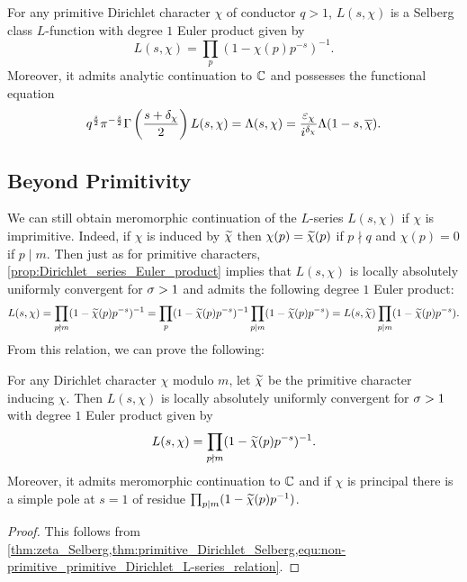       \begin{theorem}\label{thm:primitive_Dirichlet_Selberg}
        For any primitive Dirichlet character $\chi$ of conductor $q > 1$, $L(s,\chi)$ is a Selberg class $L$-function with degree $1$ Euler product given by
        \[
          L(s,\chi) = \prod_{p}(1-\chi(p)p^{-s})^{-1}.
        \]
        Moreover, it admits analytic continuation to $\mathbb{C}$ and possesses the functional equation
        \[
          q^{\frac{s}{2}}\pi^{-\frac{s}{2}}\Gamma\left(\frac{s+\delta_{\chi}}{2}\right)L(s,\chi) = \Lambda(s,\chi) = \frac{\varepsilon_{\chi}}{i^{\delta_{\chi}}}\Lambda(1-s,\overline{\chi}).
        \]
      \end{theorem}
    \subsection*{Beyond Primitivity}
      We can still obtain meromorphic continuation of the $L$-series $L(s,\chi)$ if $\chi$ is imprimitive. Indeed, if $\chi$ is induced by $\widetilde{\chi}$ then $\chi(p) = \widetilde{\chi}(p)$ if $p \nmid q$ and $\chi(p) = 0$ if $p \mid m$. Then just as for primitive characters, \cref{prop:Dirichlet_series_Euler_product} implies that $L(s,\chi)$ is locally absolutely uniformly convergent for $\sigma > 1$ and admits the following degree $1$ Euler product:
      \begin{equation}\label{equ:non-primitive_primitive_Dirichlet_L-series_relation}
        L(s,\chi) = \prod_{p \nmid m}(1-\widetilde{\chi}(p)p^{-s})^{-1} = \prod_{p}(1-\widetilde{\chi}(p)p^{-s})^{-1}\prod_{p \mid m}(1-\widetilde{\chi}(p)p^{-s}) = L(s,\widetilde{\chi})\prod_{p \mid m}(1-\widetilde{\chi}(p)p^{-s}).
      \end{equation}
      From this relation, we can prove the following:

      \begin{theorem}\label{thm:analytic_continuation_Dirichlet}
        For any Dirichlet character $\chi$ modulo $m$, let $\widetilde{\chi}$ be the primitive character inducing $\chi$. Then $L(s,\chi)$ is locally absolutely uniformly convergent for $\sigma > 1$ with degree $1$ Euler product given by
        \[
          L(s,\chi) = \prod_{p \nmid m}(1-\widetilde{\chi}(p)p^{-s})^{-1}.
        \]
        Moreover, it admits meromorphic continuation to $\mathbb{C}$ and if $\chi$ is principal there is a simple pole at $s = 1$ of residue $\prod_{p \mid m}(1-\widetilde{\chi}(p)p^{-1})$.
      \end{theorem}
      \begin{proof}
        This follows from \cref{thm:zeta_Selberg,thm:primitive_Dirichlet_Selberg,equ:non-primitive_primitive_Dirichlet_L-series_relation}. 
      \end{proof}

